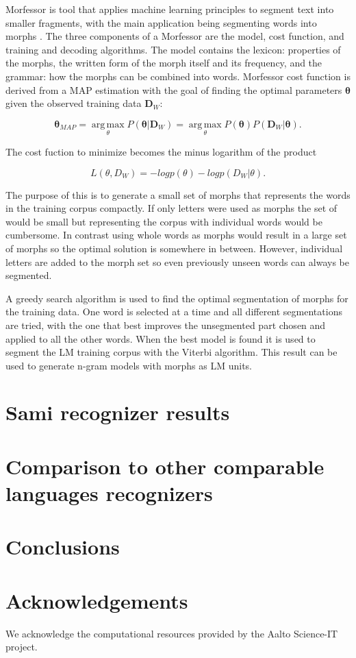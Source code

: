 \documentclass[10pt,b5paper,utf8]{article}
\begin{document}
Morfessor is tool that applies machine learning principles to segment text into smaller fragments, with the main application being segmenting words into morphs \cite{creutz2007unsupervised}. The three components of a Morfessor are the model, cost function, and training and decoding algorithms. The model contains the lexicon: properties of the morphs, the written form of the morph itself and its frequency, and the grammar: how the morphs can be combined into words. Morfessor cost function is derived from a MAP estimation with the goal of finding the optimal parameters $\bm{\theta}$ given the observed training data $\bm{D}_W$:

\begin{equation}
\bm{\theta}_{MAP}=\operatorname*{arg\,max}_{\theta}P(\bm{\theta}|\bm{D}_W)=\operatorname*{arg\,max}_{\theta}P(\bm{\theta})P(\bm{D}_W|\bm{\theta}).
\end{equation}

The cost fuction to minimize becomes the minus logarithm of the product

\begin{equation}
L(\theta, D_W)=-log p(\theta)-log p(D_W|\theta).
\end{equation}

The purpose of this is to generate a small set of morphs that represents the words in the training corpus compactly. If only letters were used as morphs the set of would be small but representing the corpus with individual words would be cumbersome. In contrast using whole words as morphs would result in a large set of morphs so the optimal solution is somewhere in between. However, individual letters are added to the morph set so even previously unseen words can always be segmented.

A greedy search algorithm is used to find the optimal segmentation of morphs for the training data. One word is selected at a time and all different segmentations are tried, with the one that best improves the unsegmented part chosen and applied to all the other words. When the best model is found it is used to segment the LM training corpus with the Viterbi algorithm. This result can be used to generate n-gram models with morphs as LM units.

\section{Sami recognizer results} 

\section{Comparison to other comparable languages recognizers}

\section{Conclusions} 

\section{Acknowledgements} 
We acknowledge the computational resources provided by the Aalto Science-IT project.




 
\end{document}
